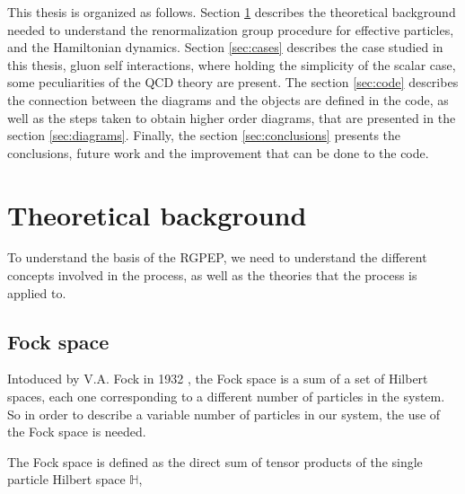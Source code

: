 \documentclass[11pt,a4paper,twoside,pdf]{article}
\numberwithin{equation}{section}
\begin{document}
This thesis is organized as follows. Section \ref{sec:theoretical_background} describes
the theoretical background needed to understand the renormalization group procedure
for effective particles, and the Hamiltonian dynamics. Section \ref{sec:cases}
describes the case studied in this thesis, gluon self interactions, where
holding the simplicity of the scalar case, some peculiarities of the QCD theory are 
present. The section \ref{sec:code} describes the connection between the diagrams 
and the objects are defined in the code, as well as the steps taken to obtain higher 
order diagrams, that are presented in the section \ref{sec:diagrams}. Finally, the 
section \ref{sec:conclusions} presents the conclusions, future work and the 
improvement that can be done to the code.



\section{Theoretical background} \label{sec:theoretical_background}

To understand the basis of the RGPEP, we need to understand the different
concepts involved in the process, as well as the theories that the process is
applied to.  

\subsection{Fock space} \label{sec:fock_space}

Intoduced by V.A. Fock in 1932 \cite{1932ZPhy...75..622F}, the Fock space is a sum 
of a set of Hilbert spaces, each one corresponding to a different number of 
particles in the system. So in order to describe a variable number of particles in our 
system, the use of the Fock space is needed.

The Fock space is defined as the direct sum of tensor products of the single 
particle Hilbert space $\mathbb{H}$,

\end{document}
